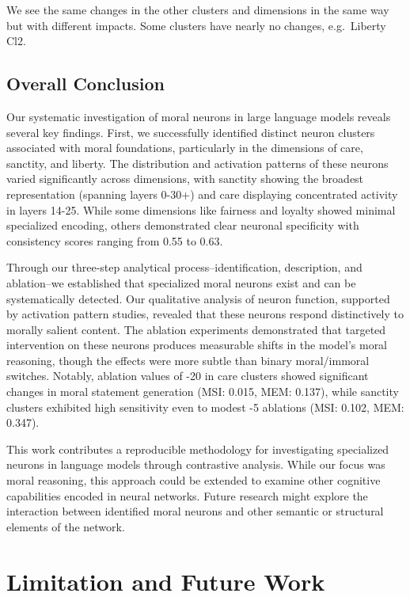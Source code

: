 \documentclass[runninghheads]{llncs}
\begin{document}
We see the same changes in the other clusters and dimensions in the same way but with different impacts. Some clusters have nearly no changes, e.g.~Liberty Cl2.

\subsection{Overall Conclusion}

    Our systematic investigation of moral neurons in large language models reveals several key findings. First, we successfully identified distinct neuron clusters associated with moral foundations, particularly in the dimensions of care, sanctity, and liberty. The distribution and activation patterns of these neurons varied significantly across dimensions, with sanctity showing the broadest representation (spanning layers 0-30+) and care displaying concentrated activity in layers 14-25. While some dimensions like fairness and loyalty showed minimal specialized encoding, others demonstrated clear neuronal specificity with consistency scores ranging from 0.55 to 0.63.

Through our three-step analytical process--identification, description, and ablation--we established that specialized moral neurons exist and can be systematically detected. Our qualitative analysis of neuron function, supported by activation pattern studies, revealed that these neurons respond distinctively to morally salient content. The ablation experiments demonstrated that targeted intervention on these neurons produces measurable shifts in the model's moral reasoning, though the effects were more subtle than binary moral/immoral switches. Notably, ablation values of -20 in care clusters showed significant changes in moral statement generation (MSI: 0.015, MEM: 0.137), while sanctity clusters exhibited high sensitivity even to modest -5 ablations (MSI: 0.102, MEM: 0.347).

This work contributes a reproducible methodology for investigating specialized neurons in language models through contrastive analysis. While our focus was moral reasoning, this approach could be extended to examine other cognitive capabilities encoded in neural networks. Future research might explore the interaction between identified moral neurons and other semantic or structural elements of the network.


\section{Limitation and Future Work}
\label{outlook}
\end{document}
